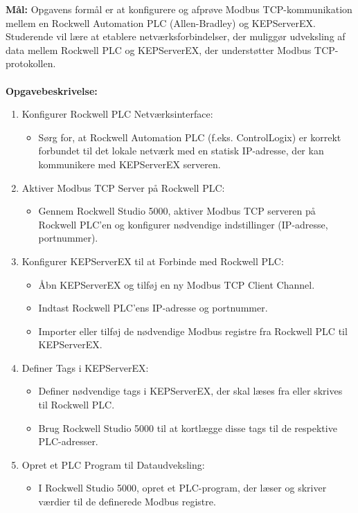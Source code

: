\textbf{Mål:} Opgavens formål er at konfigurere og afprøve Modbus TCP-kommunikation mellem en Rockwell Automation PLC (Allen-Bradley) og KEPServerEX. Studerende vil lære at etablere netværksforbindelser, der muliggør udveksling af data mellem Rockwell PLC og KEPServerEX, der understøtter Modbus TCP-protokollen.
\\\\
\noindent\textbf{Opgavebeskrivelse:}
\begin{enumerate}
	\item Konfigurer Rockwell PLC Netværksinterface:
	\begin{itemize}
		\item Sørg for, at Rockwell Automation PLC (f.eks. ControlLogix) er korrekt forbundet til det lokale netværk med en statisk IP-adresse, der kan kommunikere med KEPServerEX serveren.
	\end{itemize}
	\item Aktiver Modbus TCP Server på Rockwell PLC:
	\begin{itemize}
		\item Gennem Rockwell Studio 5000, aktiver Modbus TCP serveren på Rockwell PLC'en og konfigurer nødvendige indstillinger (IP-adresse, portnummer).
	\end{itemize}
	\item Konfigurer KEPServerEX til at Forbinde med Rockwell PLC:
	\begin{itemize}
		\item Åbn KEPServerEX og tilføj en ny Modbus TCP Client Channel.
		\item Indtast Rockwell PLC’ens IP-adresse og portnummer.
		\item Importer eller tilføj de nødvendige Modbus registre fra Rockwell PLC til KEPServerEX.
	\end{itemize}
	\item Definer Tags i KEPServerEX:
	\begin{itemize}
		\item Definer nødvendige tags i KEPServerEX, der skal læses fra eller skrives til Rockwell PLC.
		\item Brug Rockwell Studio 5000 til at kortlægge disse tags til de respektive PLC-adresser.
	\end{itemize}
	\item Opret et PLC Program til Dataudveksling:
	\begin{itemize}
		\item I Rockwell Studio 5000, opret et PLC-program, der læser og skriver værdier til de definerede Modbus registre.

\end{itemize}
\end{enumerate}
